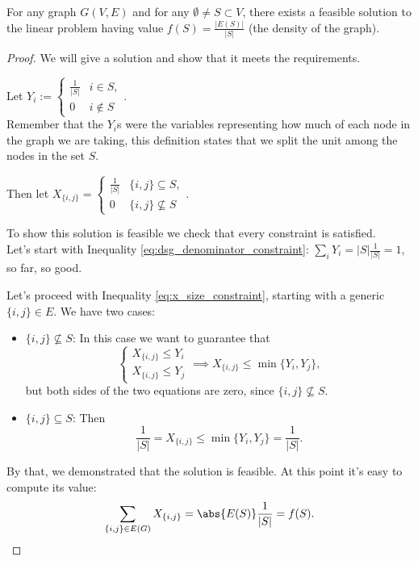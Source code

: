 \pagebreak

\begin{lem}\label{l:dsp-feasibility}
    For any graph $G(V,E)$ and for any $\emptyset \neq S \subset V$, there exists a feasible solution to the linear problem having value $f(S)=\frac{|E(S)|}{|S|}$ (the density of the graph).
\end{lem}
\begin{proof}
    We will give a solution and show that it meets the requirements.
    
    Let $Y_i :=
    \begin{cases}
    \frac{1}{|S|} & i \in S,\\
    0 & i \not\in S
    \end{cases}$.\\
    Remember that the $Y_i$s were the variables representing how much of each node in the graph we are taking, this definition states that we split the unit among the nodes in the set $S$.
    
    Then let $X_{\{i, j\}} = 
    \begin{cases}
    \frac{1}{|S|} & \{i, j\} \subseteq S,\\
    0 & \{i, j\} \not\subseteq S
    \end{cases}$.
    
    To show this solution is feasible we check that every constraint is satisfied.\\
    Let's start with Inequality \ref{eq:dsg_denominator_constraint}:
    $\sum_{i} Y_i = |S| \frac{1}{|S|} = 1$, 
    so far, so good.
    
    Let's proceed with Inequality \ref{eq:x_size_constraint}, starting with a generic $\{i, j\} \in E$. We have two cases:
    \begin{itemize}
        \item $\{i, j\} \not\subseteq S$: In this case we want to guarantee that
        \begin{equation}
            \begin{cases}
                X_{\{i, j\}} \leq Y_i\\
                X_{\{i, j\}} \leq Y_j
            \end{cases}
            \implies X_{\{i, j\}} \leq \min{\{Y_i, Y_j\}},
        \end{equation}
        but both sides of the two equations are zero, since $\{i, j\} \not\subseteq S$.
        
        \item $\{i, j\} \subseteq S$: Then
        \begin{equation}
            \frac{1}{|S|} = X_{\{i, j\}} \leq  \min{\{Y_i, Y_j\}} = \frac{1}{|S|}.
        \end{equation}
    \end{itemize}
    
    By that, we demonstrated that the solution is feasible. At this point it's easy to compute its value:
    \begin{equation}
    \sum_{\{i, j\} \in E(G)} X_{\{i, j\}}= \abs{E(S)} \frac{1}{|S|} = f(S).
    \end{equation}
\end{proof}

